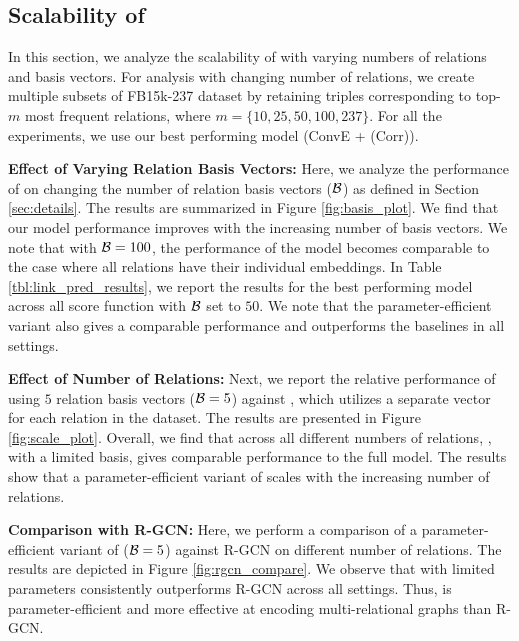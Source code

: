 \documentclass{article} \usepackage{iclr2020_conference,times}
\begin{document}
\vspace{-1mm}
\subsection{Scalability of \method{}} 
\label{sec:results_basis}
\vspace{-1mm}
In this section, we analyze the scalability of \method{} with varying numbers of relations and basis vectors. For analysis with changing number of relations, we create multiple subsets of FB15k-237 dataset by retaining triples corresponding to top-$m$ most frequent relations, where $m=\{10,25,50,100,237\}$. For all the experiments, we use our best performing model (ConvE + \method{} (Corr)).

\textbf{Effect of Varying Relation Basis Vectors:} Here, we analyze the performance of \method{} on changing the number of relation basis vectors ($\mathcal{B}$) as defined in Section \ref{sec:details}. 
The results are summarized in Figure \ref{fig:basis_plot}. We find that our model performance improves with the increasing number of basis vectors. We note that with $\mathcal{B}=100$, the performance of the model becomes comparable to the case where all relations have their individual embeddings. 
In Table \ref{tbl:link_pred_results}, we report the results for the best performing model across all score function with $\mathcal{B}$ set to $50$. We note that the parameter-efficient variant also gives a comparable performance and outperforms the baselines in all settings. 

\textbf{Effect of Number of Relations:} Next, we report the relative performance of \method{} using $5$ relation basis vectors ($\mathcal{B}=5$) against \method{}, which utilizes a separate vector for each relation in the dataset. The results are presented in Figure \ref{fig:scale_plot}. Overall, we find that across all different numbers of relations, \method{}, with a limited basis, gives comparable performance to the full model. The results show that a parameter-efficient variant of \method{} scales with the increasing number of relations.



\textbf{Comparison with R-GCN:} Here, we perform a comparison of a parameter-efficient variant of \method{} ($\mathcal{B}=5$) against R-GCN on different number of relations. The results are depicted in Figure \ref{fig:rgcn_compare}. We observe that \method{} with limited parameters consistently outperforms R-GCN across all settings. Thus, \method{} is parameter-efficient and more effective at encoding multi-relational graphs than R-GCN. 
\end{document}
